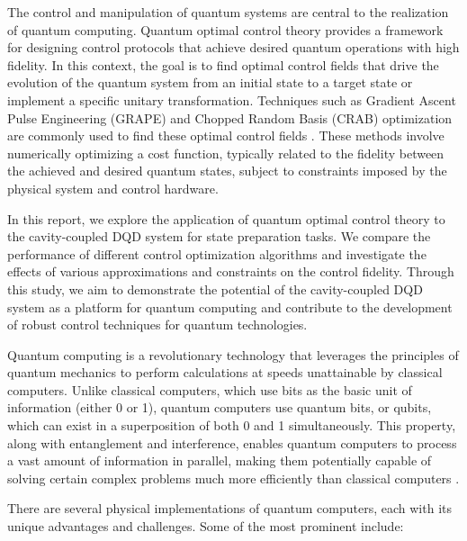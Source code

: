 \documentclass[12pt]{article}
\begin{document}
The control and manipulation of quantum systems are central to the realization of quantum computing. Quantum optimal control theory provides a framework for designing control protocols that achieve desired quantum operations with high fidelity. In this context, the goal is to find optimal control fields that drive the evolution of the quantum system from an initial state to a target state or implement a specific unitary transformation. Techniques such as Gradient Ascent Pulse Engineering (GRAPE) and Chopped Random Basis (CRAB) optimization are commonly used to find these optimal control fields \cite{khaneja2005, cai2011}. These methods involve numerically optimizing a cost function, typically related to the fidelity between the achieved and desired quantum states, subject to constraints imposed by the physical system and control hardware.

In this report, we explore the application of quantum optimal control theory to the cavity-coupled DQD system for state preparation tasks. We compare the performance of different control optimization algorithms and investigate the effects of various approximations and constraints on the control fidelity. Through this study, we aim to demonstrate the potential of the cavity-coupled DQD system as a platform for quantum computing and contribute to the development of robust control techniques for quantum technologies.


Quantum computing is a revolutionary technology that leverages the principles of quantum mechanics to perform calculations at speeds unattainable by classical computers. Unlike classical computers, which use bits as the basic unit of information (either 0 or 1), quantum computers use quantum bits, or qubits, which can exist in a superposition of both 0 and 1 simultaneously. This property, along with entanglement and interference, enables quantum computers to process a vast amount of information in parallel, making them potentially capable of solving certain complex problems much more efficiently than classical computers \cite{nielsen2002quantum}.

There are several physical implementations of quantum computers, each with its unique advantages and challenges. Some of the most prominent include:
\end{document}
